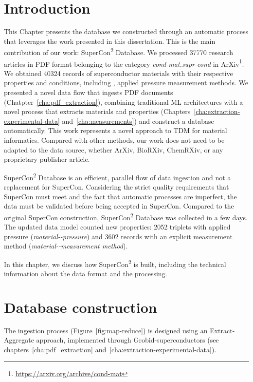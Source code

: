 \section{Introduction}

This Chapter presents the database we constructed through an automatic process that leverages the work presented in this dissertation. 
This is the main contribution of our work: SuperCon\textsuperscript{2} Database. 
We processed 37770 research articles in PDF format belonging to the category \textit{ cond-mat.supr-cond} in ArXiv\footnote{\url{https://arxiv.org/archive/cond-mat}}. We obtained 40324 records of superconductor materials with their respective properties and conditions, including \tc, applied pressure measurement methods. 
We presented a novel data flow that ingests PDF documents (Chatpter~\ref{cha:pdf_extraction}), combining traditional ML architectures with a novel process that extracts materials and properties (Chapters~\ref{cha:extraction-experimental-data} and~\ref{cha:measurements}) and construct a database automatically.
This work represents a novel approach to TDM for material informatics. 
Compared with other methods, our work does not need to be adapted to the data source, whether ArXiv, BioRXiv, ChemRXiv, or any proprietary publisher article.  

SuperCon\textsuperscript{2} Database is an efficient, parallel flow of data ingestion and not a replacement for SuperCon.
Considering the strict quality requirements that SuperCon must meet and the fact that automatic processes are imperfect, the data must be validated before being accepted in SuperCon.  
Compared to the original SuperCon construction, SuperCon\textsuperscript{2} Database was collected in a few days. 
The updated data model counted new properties: 2052 triplets with applied pressure (\textit{material-\tc-pressure}) and 3602 records with an explicit measurement method (\textit{material-\tc-measurement method}).

In this chapter, we discuss how SuperCon\textsuperscript{2} is built, including the technical information about the data format and the processing. 


\section{Database construction}
\label{sec:ingestion}

The ingestion process (Figure~\ref{fig:map-reduce}) is designed using an Extract-Aggregate approach, implemented through Grobid-superconductors (see chapters~\ref{cha:pdf_extraction} and~\ref{cha:extraction-experimental-data}).

